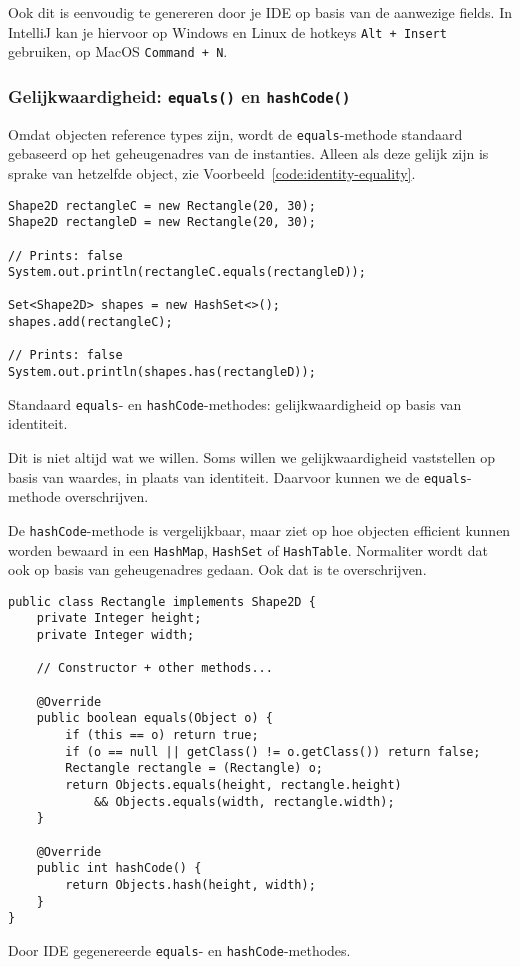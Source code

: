 Ook dit is eenvoudig te genereren door je IDE op basis van de aanwezige fields.
In IntelliJ kan je hiervoor op Windows en Linux de hotkeys \texttt{Alt + Insert} gebruiken, 
op MacOS \texttt{Command + N}.

\subsubsection{Gelijkwaardigheid: \texttt{equals()} en \texttt{hashCode()}}
Omdat objecten reference types zijn, wordt de \texttt{equals}-methode standaard gebaseerd 
op het geheugenadres van de instanties. Alleen als deze gelijk zijn is sprake van 
hetzelfde object, zie Voorbeeld~\ref{code:identity-equality}.

\begin{listing}[H]
\begin{verbatim}
Shape2D rectangleC = new Rectangle(20, 30);
Shape2D rectangleD = new Rectangle(20, 30);

// Prints: false
System.out.println(rectangleC.equals(rectangleD));

Set<Shape2D> shapes = new HashSet<>();
shapes.add(rectangleC);

// Prints: false
System.out.println(shapes.has(rectangleD));

\end{verbatim}
\caption{Standaard \texttt{equals}- en \texttt{hashCode}-methodes: 
gelijkwaardigheid op basis van identiteit.}
\label{code:identity-equality}
\end{listing}

Dit is niet altijd wat we willen. Soms willen we gelijkwaardigheid
vaststellen op basis van waardes, in plaats van identiteit. Daarvoor kunnen we 
de \texttt{equals}-methode overschrijven.

De \texttt{hashCode}-methode is vergelijkbaar, maar ziet op hoe objecten 
efficient kunnen worden bewaard in 
een \texttt{HashMap}, \texttt{HashSet} of \texttt{HashTable}.
Normaliter wordt dat ook op basis van geheugenadres gedaan. Ook dat is te overschrijven.

\begin{listing}[H]
\begin{verbatim}
public class Rectangle implements Shape2D {
    private Integer height;
    private Integer width;

    // Constructor + other methods...

    @Override
    public boolean equals(Object o) {
        if (this == o) return true;
        if (o == null || getClass() != o.getClass()) return false;
        Rectangle rectangle = (Rectangle) o;
        return Objects.equals(height, rectangle.height) 
            && Objects.equals(width, rectangle.width);
    }

    @Override
    public int hashCode() {
        return Objects.hash(height, width);
    }
}
\end{verbatim}
\caption{Door IDE gegenereerde \texttt{equals}- en \texttt{hashCode}-methodes.}
\label{code:hashcode-equals}
\end{listing}

